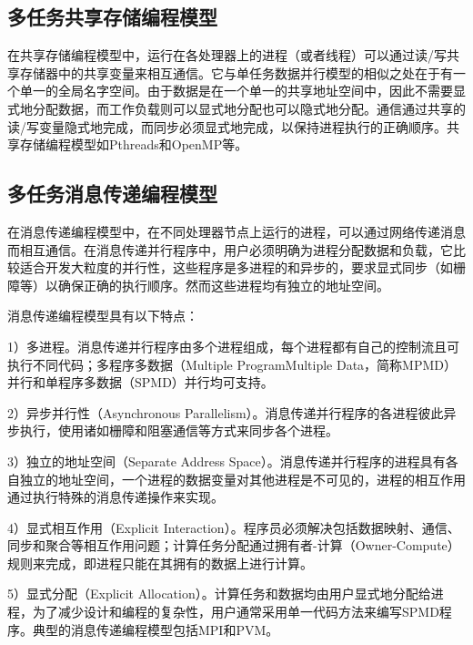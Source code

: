 \documentclass[]{ctexbook}
\begin{document}
\hypertarget{ux591aux4efbux52a1ux5171ux4eabux5b58ux50a8ux7f16ux7a0bux6a21ux578b}{%
\subsection{多任务共享存储编程模型}\label{ux591aux4efbux52a1ux5171ux4eabux5b58ux50a8ux7f16ux7a0bux6a21ux578b}}

在共享存储编程模型中，运行在各处理器上的进程（或者线程）可以通过读/写共享存储器中的共享变量来相互通信。它与单任务数据并行模型的相似之处在于有一个单一的全局名字空间。由于数据是在一个单一的共享地址空间中，因此不需要显式地分配数据，而工作负载则可以显式地分配也可以隐式地分配。通信通过共享的读/写变量隐式地完成，而同步必须显式地完成，以保持进程执行的正确顺序。共享存储编程模型如Pthreads和OpenMP等。

\hypertarget{ux591aux4efbux52a1ux6d88ux606fux4f20ux9012ux7f16ux7a0bux6a21ux578b}{%
\subsection{多任务消息传递编程模型}\label{ux591aux4efbux52a1ux6d88ux606fux4f20ux9012ux7f16ux7a0bux6a21ux578b}}

在消息传递编程模型中，在不同处理器节点上运行的进程，可以通过网络传递消息而相互通信。在消息传递并行程序中，用户必须明确为进程分配数据和负载，它比较适合开发大粒度的并行性，这些程序是多进程的和异步的，要求显式同步（如栅障等）以确保正确的执行顺序。然而这些进程均有独立的地址空间。

消息传递编程模型具有以下特点：

1）多进程。消息传递并行程序由多个进程组成，每个进程都有自己的控制流且可执行不同代码；多程序多数据（Multiple ProgramMultiple Data，简称MPMD）并行和单程序多数据（SPMD）并行均可支持。

2）异步并行性（Asynchronous Parallelism）。消息传递并行程序的各进程彼此异步执行，使用诸如栅障和阻塞通信等方式来同步各个进程。

3）独立的地址空间（Separate Address Space）。消息传递并行程序的进程具有各自独立的地址空间，一个进程的数据变量对其他进程是不可见的，进程的相互作用通过执行特殊的消息传递操作来实现。

4）显式相互作用（Explicit Interaction）。程序员必须解决包括数据映射、通信、同步和聚合等相互作用问题；计算任务分配通过拥有者-计算（Owner-Compute）规则来完成，即进程只能在其拥有的数据上进行计算。

5）显式分配（Explicit Allocation）。计算任务和数据均由用户显式地分配给进程，为了减少设计和编程的复杂性，用户通常采用单一代码方法来编写SPMD程序。典型的消息传递编程模型包括MPI和PVM。
\end{document}
